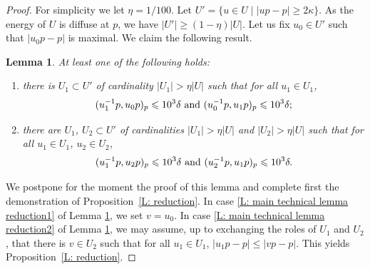 \documentclass[JEP,XML,SOM,Unicode, NoEqCountersInSection,published]{cedram}
\theoremstyle{plain}
\newtheorem{lem}[thm]{Lemma}
\theoremstyle{definition}
\begin{document}
\begin{proof}
For simplicity we let $\eta = 1/100$.
Let $U'=\{u\in U\mid |up-p|\geqslant 2\kappa\}$.
As the energy of $U$ is diffuse at $p$, we have $|U'|\geq (1-\eta) |U|$.
Let us fix $u_0\in U'$ such that $|u_0p-p|$ is maximal.
We claim the following result.

\begin{lem}\label{L: main technical lemma reduction}
At least one of the following holds:
\begin{enumerate}
\item\label{L: main technical lemma reduction1} there is $U_1\subset U'$ of cardinality $|U_1|>\eta |U|$ such that for all $u_1\in U_1$,
\[
(u_1^{-1}p,u_0p)_p\leqslant 10^3 \delta \hbox{ and } (u_0^{-1}p,u_1p)_p\leqslant 10^3 \delta;
\]
\item\label{L: main technical lemma reduction2} there are $U_1$, $U_2 \subset U'$ of cardinalities $|U_1|>\eta |U|$ and $|U_2|>\eta |U|$ such that for all $u_1\in U_1$, $u_2\in U_2$,
\[
(u_1^{-1}p,u_2p)_p\leqslant 10^3 \delta \hbox{ and } (u_2^{-1}p,u_1p)_p\leqslant 10^3 \delta.
\]
\end{enumerate}

\end{lem}

We postpone for the moment the proof of this lemma and complete first the demonstration of Proposition~\ref{L: reduction}.
In case \eqref{L: main technical lemma reduction1} of Lemma \ref{L: main technical lemma reduction}, we set $v=u_0$. In case \eqref{L: main technical lemma reduction2} of Lemma \ref{L: main technical lemma reduction}, we may assume, up to exchanging the roles of $U_1$ and $U_2$, that there is $v\in U_2$ such that for all $u_1\in U_1$, $|u_1p-p|\leqslant |vp-p|$. This yields Proposition~\ref{L: reduction}.
\end{proof}
\end{document}
